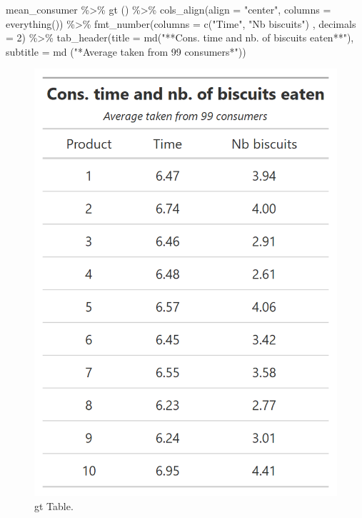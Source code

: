 \documentclass[
]{krantz}
\makeatletter
\newenvironment{Shaded}{\begin{snugshade}}{\end{snugshade}}
\newcommand{\AttributeTok}[1]{\textcolor[rgb]{0.61,0.61,0.61}{#1}}
\newcommand{\DecValTok}[1]{\textcolor[rgb]{0.06,0.06,0.06}{#1}}
\newcommand{\FunctionTok}[1]{\textcolor[rgb]{0,0,0}{#1}}
\newcommand{\NormalTok}[1]{#1}
\newcommand{\SpecialCharTok}[1]{\textcolor[rgb]{0,0,0}{#1}}
\newcommand{\StringTok}[1]{\textcolor[rgb]{0.5,0.5,0.5}{#1}}
\newenvironment{kframe}{%
\medskip{}
\setlength{\fboxsep}{.8em}
 \def\at@end@of@kframe{}%
 \ifinner\ifhmode%
  \def\at@end@of@kframe{\end{minipage}}%
  \begin{minipage}{\columnwidth}%
 \fi\fi%
 \def\FrameCommand##1{\hskip\@totalleftmargin \hskip-\fboxsep
 \colorbox{shadecolor}{##1}\hskip-\fboxsep
     \hskip-\linewidth \hskip-\@totalleftmargin \hskip\columnwidth}%
 \MakeFramed {\advance\hsize-\width
   \@totalleftmargin\z@ \linewidth\hsize
   \@setminipage}}%
 {\par\unskip\endMakeFramed%
 \at@end@of@kframe}
\renewenvironment{Shaded}{\begin{kframe}}{\end{kframe}}
\makeatother
\begin{document}
\begin{Shaded}
\begin{Highlighting}[]
\NormalTok{mean\_consumer }\SpecialCharTok{\%\textgreater{}\%}
  \FunctionTok{gt}\NormalTok{ () }\SpecialCharTok{\%\textgreater{}\%}
  \FunctionTok{cols\_align}\NormalTok{(}\AttributeTok{align =} \StringTok{"center"}\NormalTok{, }\AttributeTok{columns =} \FunctionTok{everything}\NormalTok{()) }\SpecialCharTok{\%\textgreater{}\%}
  \FunctionTok{fmt\_number}\NormalTok{(}\AttributeTok{columns =} \FunctionTok{c}\NormalTok{(}\StringTok{"Time"}\NormalTok{, }\StringTok{"Nb biscuits"}\NormalTok{) , }\AttributeTok{decimals =} \DecValTok{2}\NormalTok{) }\SpecialCharTok{\%\textgreater{}\%}
  \FunctionTok{tab\_header}\NormalTok{(}\AttributeTok{title =} \FunctionTok{md}\NormalTok{(}\StringTok{"**Cons. time and nb. of biscuits eaten**"}\NormalTok{), }
             \AttributeTok{subtitle =} \FunctionTok{md}\NormalTok{ (}\StringTok{"*Average taken from 99 consumers*"}\NormalTok{))}
\end{Highlighting}
\end{Shaded}

\begin{figure}

{\centering \includegraphics[width=1\linewidth]{images/gt_table} 

}

\caption{gt Table.}\label{fig:gttable}
\end{figure}
\end{document}
